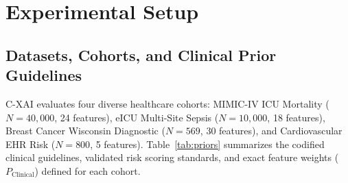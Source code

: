 \documentclass[3p,times,procedia]{elsarticle}
\theoremstyle{definition}
\begin{document}
\section{Experimental Setup}

\subsection{Datasets, Cohorts, and Clinical Prior Guidelines}

C-XAI evaluates four diverse healthcare cohorts: MIMIC-IV ICU Mortality ($N=40,000$, 24 features), eICU Multi-Site Sepsis ($N=10,000$, 18 features), Breast Cancer Wisconsin Diagnostic ($N=569$, 30 features), and Cardiovascular EHR Risk ($N=800$, 5 features). Table~\ref{tab:priors} summarizes the codified clinical guidelines, validated risk scoring standards, and exact feature weights ($P_{\mathrm{Clinical}}$) defined for each cohort.
\end{document}
